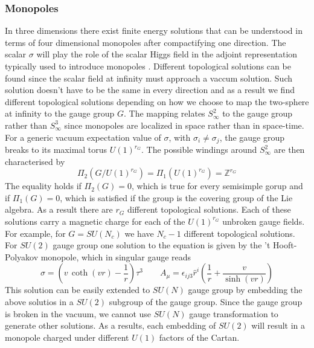  
\subsubsection{Monopoles}
In three dimensions there exist finite energy solutions that can be understood in terms of four dimensional monopoles after compactifying one direction.
The scalar $\sigma$ will play the role of the scalar Higgs field in the adjoint representation typically used to introduce monopoles \cite{Weinberg:2006rq}.
Different topological solutions can be found since the scalar field at infinity must approach a vaccum solution.
Such solution doesn't have to be the same in every direction and as a result we find different topological solutions depending on how we choose to map the two-sphere at infinity to the gauge group $G$.
The mapping relates $S^2_{\infty}$ to the gauge group rather than $S^3_{\infty}$ since monopoles are localized in space rather than in space-time.\\
For a generic vacuum expectation value of $\sigma$, with $\sigma_i \neq \sigma_j$, the gauge group breaks to its maximal torus $U(1)^{r_G}$.
The possible windings around $S^2_{\infty}$ are then characterised by
\begin{equation}
 \Pi_{2} \left( G / U(1)^{r_G} \right) = \Pi_1 (U(1)^{r_G}) = \mathbb{Z}^{r_G}
\end{equation}
The equality holds if $\Pi_2(G) = 0$, which is true for every semisimple gorup and if $\Pi_1(G) = 0$, which is satisfied if the group is the covering group of the Lie algebra.
As a result there are $r_G$ different topological solutions.
Each of these solutions carry a magnetic charge for each of the $U(1)^{r_G}$ unbroken gauge fields. 
For example, for $G= SU(N_c)$ we have $N_c-1$ different topological solutions.
\\
For $SU(2)$ gauge group one solution to the equation is given by the 't Hooft-Polyakov monopole, which in singular gauge reads
\begin{equation}
  \sigma = \left( v \, \coth (v r) - \frac{1}{r} \right)  \tau^3 \qquad A_{\mu} = \epsilon_{i j 3} \hat{r}^i \left( \frac{1}{r} + \frac{v}{\sinh (vr)} \right)
\end{equation}
This solution can be easily extended to $SU(N)$ gauge group by embedding the above solutios in a $SU(2)$ subgroup of the gauge group.
Since the gauge group is broken in the vacuum, we cannot use $SU(N)$ gauge transformation to generate other solutions.
As a results, each embedding of $SU(2)$ will result in a monopole charged under different $U(1)$ factors of the Cartan. 
